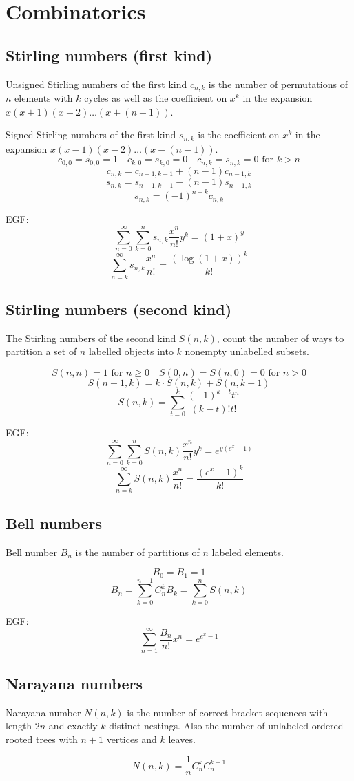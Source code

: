 \chapter{Combinatorics}
\section{Stirling numbers (first kind)}
Unsigned Stirling numbers of the first kind $c_{n, k}$ is the number of permutations of $n$ elements with $k$ cycles as well as the coefficient on $x^k$ in the expansion $x(x + 1)(x + 2)\dots(x + (n - 1))$.


Signed Stirling numbers of the first kind $s_{n, k}$ is the coefficient on $x^k$ in the expansion $x(x - 1)(x - 2)\dots(x - (n - 1))$.
$$c_{0, 0} = s_{0, 0} = 1 \quad c_{k, 0} = s_{k, 0} = 0 \quad c_{n, k} = s_{n, k} = 0 \text{ for } k > n$$
$$c_{n, k} = c_{n - 1, k - 1} + (n - 1)c_{n - 1, k}$$
$$s_{n, k} = s_{n - 1, k - 1} - (n - 1)s_{n - 1, k}$$
$$s_{n, k} = (-1)^{n + k}c_{n, k}$$

EGF:
$$\sum_{n = 0}^{\infty}\sum_{k = 0}^{n}s_{n, k}\frac{x^n}{n!}y^k = (1 + x)^y$$
$$\sum_{n = k}^{\infty}s_{n, k}\frac{x^n}{n!} = \frac{(\log(1 + x))^k}{k!}$$

\section{Stirling numbers (second kind)}

The Stirling numbers of the second kind $S(n, k)$, count the number of ways to partition a set of $n$ labelled objects into $k$ nonempty unlabelled subsets.

$$S(n, n) = 1 \text{ for } n \ge 0 \quad S(0, n) = S(n, 0) = 0 \text{ for } n > 0$$
$$S(n + 1, k) = k \cdot S(n, k) + S(n, k - 1)$$
$$S(n, k) = \sum_{t = 0}^{k} \frac{(-1)^{k - t}t^n}{(k - t)!t!}$$

EGF:
$$\sum_{n = 0}^{\infty}\sum_{k=0}^{n} S(n, k)\frac{x^n}{n!}y^k = e^{y(e^x - 1)}$$
$$\sum_{n = k}^{\infty} S(n, k)\frac{x^n}{n!} = \frac{(e^x - 1)^k}{k!}$$




\section{Bell numbers}
Bell number $B_n$ is the number of partitions of $n$ labeled elements.

$$B_0 = B_1 = 1$$
$$B_n = \sum_{k = 0}^{n - 1} C_n^k B_k = \sum_{k = 0}^{n} S(n, k)$$

EGF:
$$\sum_{n = 1}^{\infty}\frac{B_n}{n!}x^n = e^{e^x - 1}$$




\section{Narayana numbers}
Narayana number $N(n, k)$ is the number of correct bracket sequences with length $2n$ and exactly $k$ distinct nestings. Also the number of unlabeled ordered rooted trees with $n + 1$ vertices and $k$ leaves.

$$N(n, k) = \frac{1}{n}C_{n}^{k}C_{n}^{k - 1}$$